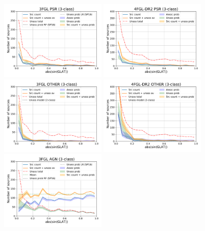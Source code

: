 \begin{figure}[h]
\centering
\includegraphics[width=0.45\textwidth]{plots/lat_profile_PSR_3FGL_3classes.pdf}
\includegraphics[width=0.45\textwidth]{plots/lat_profile_PSR_4FGL-DR2_3classes.pdf} \\
\includegraphics[width=0.45\textwidth]{plots/lat_profile_OTHER_3FGL_3classes.pdf}
\includegraphics[width=0.45\textwidth]{plots/lat_profile_OTHER_4FGL-DR2_3classes.pdf} \\ 
\includegraphics[width=0.45\textwidth]{plots/lat_profile_AGN_3FGL_3classes.pdf}

\end{figure}
